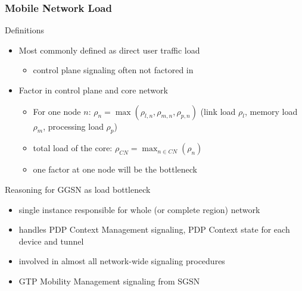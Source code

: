 \documentclass{beamer}
\begin{document}
\begin{frame}
	\frametitle{Mobile Network Load}
	
	Definitions
	\begin{itemize}
		\item Most commonly defined as direct user traffic load
			\begin{itemize}
				\item control plane signaling often not factored in
			\end{itemize}

		\item Factor in control plane and core network
			\begin{itemize}
				\item For one node $n$: $\rho_{n} = \max(\rho_{l,n}, \rho_{m,n}, \rho_{p,n})$ (link load $\rho_{l}$, memory load $\rho_{m}$, processing load $\rho_{p}$)
				\item total load of the core: $\rho_{CN} = \max_{n \in CN}(\rho_{n})$
				\item one factor at one node will be the bottleneck
			\end{itemize}
	\end{itemize}


	Reasoning for GGSN as load bottleneck
	\begin{itemize}
		\item single instance responsible for whole (or complete region) network
		\item handles PDP Context Management signaling, PDP Context state for each device and tunnel
		\item involved in almost all network-wide signaling procedures
		\item GTP Mobility Management signaling from SGSN
	\end{itemize}


\end{frame}
\end{document}
